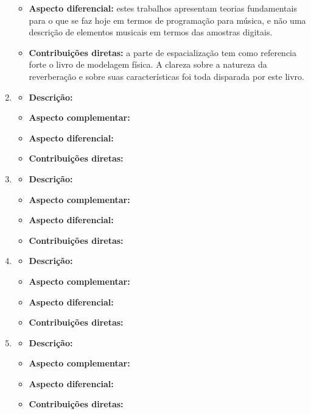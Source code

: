 \begin{enumerate}
\begin{itemize}
            \item {\bf Aspecto diferencial:} estes trabalhos apresentam teorias fundamentais para o que se faz hoje em termos de programação para música, e não uma descrição de elementos musicais em termos das amostras digitais.
            \item {\bf Contribuições diretas:} a parte de espacialização tem como referencia forte o livro de modelagem física. A clareza sobre a natureza da reverberação e sobre suas características foi toda disparada por este livro.
        \end{itemize}
    \item \emph{}
        \begin{itemize}
            \item {\bf Descrição:}
            \item {\bf Aspecto complementar:}
            \item {\bf Aspecto diferencial:}
            \item {\bf Contribuições diretas:}
        \end{itemize}
    \item \emph{}
        \begin{itemize}
            \item {\bf Descrição:}
            \item {\bf Aspecto complementar:}
            \item {\bf Aspecto diferencial:}
            \item {\bf Contribuições diretas:}
        \end{itemize}
    \item \emph{}
        \begin{itemize}
            \item {\bf Descrição:}
            \item {\bf Aspecto complementar:}
            \item {\bf Aspecto diferencial:}
            \item {\bf Contribuições diretas:}
        \end{itemize}
    \item \emph{}
        \begin{itemize}
            \item {\bf Descrição:}
            \item {\bf Aspecto complementar:}
            \item {\bf Aspecto diferencial:}
            \item {\bf Contribuições diretas:}

\end{itemize}
\end{enumerate}
